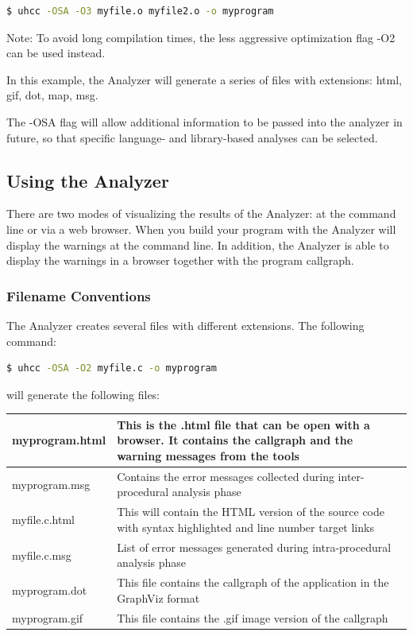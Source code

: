 \begin{lstlisting}[language=bash]
  $ uhcc -OSA -O3 myfile.o myfile2.o -o myprogram 
\end{lstlisting}

Note: To avoid long compilation times, the less aggressive
optimization flag -O2 can be used instead.

In this example, the \openshmem Analyzer will generate a
series of files with extensions: html, gif, dot, map, msg.

The -OSA flag will allow additional information to be passed into the
analyzer in future, so that specific language- and library-based
analyses can be selected.

\subsection{Using the \openshmem Analyzer}

There are two modes of visualizing the results of the \openshmem
Analyzer: at the command line or via a web browser. When you build
your program with the \openshmem Analyzer will display the warnings at
the command line. In addition, the \openshmem Analyzer is able to
display the warnings in a browser together with the program callgraph.

\subsubsection{Filename Conventions}

The \openshmem Analyzer creates several files with different extensions. 
The following command:

\begin{lstlisting}[language=bash]
  $ uhcc -OSA -O2 myfile.c -o myprogram
\end{lstlisting}

will generate the following files:

\vspace{0.1in}

\begin{center}
  \begin{tabular}{| l | p{10cm} |}
    \hline
    myprogram.html & This is the .html file that can be open with a browser. It contains the callgraph and the warning messages from the tools \\
    \hline
    myprogram.msg & Contains the error messages collected during inter-procedural analysis phase \\
    \hline
    myfile.c.html & This will contain the HTML version of the source code with syntax highlighted and line number target links \\
    \hline
    myfile.c.msg & List of error messages generated during intra-procedural analysis phase \\
    \hline
    myprogram.dot & This file contains the callgraph of the application in the GraphViz format \\
    \hline
    myprogram.gif & This file contains the .gif image version of the callgraph \\
    \hline
  \end{tabular}
\end{center}

